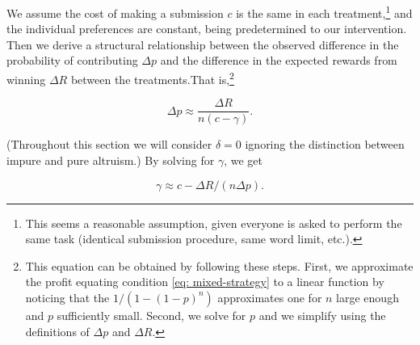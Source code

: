 \documentclass[11pt, titlepage]{article}
\begin{document}
We assume the cost of making a submission \(c\) is the same in each
treatment,\footnote{This seems a reasonable assumption, given everyone
  is asked to perform the same task (identical submission procedure,
  same word limit, etc.).} and the individual preferences are constant,
being predetermined to our intervention. Then we derive a structural
relationship between the observed difference in the probability of
contributing \(\Delta p\) and the difference in the expected rewards
from winning \(\Delta R\) between the treatments.That is,\footnote{This
  equation can be obtained by following these steps. First, we
  approximate the profit equating condition \eqref{eq: mixed-strategy}
  to a linear function by noticing that the \(1/(1-(1-p)^n)\)
  approximates one for \(n\) large enough and \(p\) sufficiently small.
  Second, we solve for \(p\) and we simplify using the definitions of
  \(\Delta p\) and \(\Delta R\).}

\begin{equation}
  \Delta p \approx\frac{\Delta R}{n (c - \gamma)}.
\end{equation}

(Throughout this section we will consider \(\delta=0\) ignoring the
distinction between impure and pure altruism.) By solving for
\(\gamma\), we get

\begin{equation}
  \label{eq: gamma}
  \gamma   \approx  c -  \Delta R / (n\Delta p). 
\end{equation}
\end{document}
